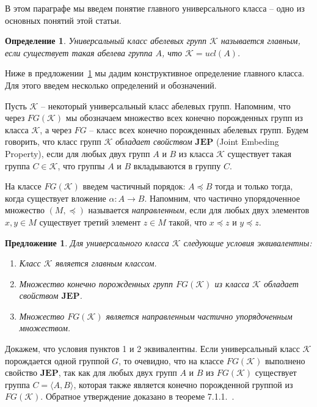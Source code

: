 \documentclass[a4paper,11pt,twoside]{article}
\newtheorem{proposition}{Предложение}[section]
\newtheorem{definition}{Определение}[section]
\def\proof{{\noindent{\bf Доказательство.}} }
\def\K{{\mathcal{K}}}
\def\JEP{{\textbf{JEP}}}
\begin{document}
В этом параграфе мы введем понятие главного универсального класса -- одно из основных понятий этой статьи.

\begin{definition}\label{def:MainClass}
Универсальный класс абелевых групп $\K$ называется главным, если существует такая абелева группа $A$, что $\K = ucl(A)$.
\end{definition}

Ниже в предложении~\ref{prop:DefinitionsMainClass} мы дадим конструктивное определение главного класса. Для этого введем несколько определений и обозначений.

Пусть $\K$ -- некоторый универсальный класс абелевых групп. Напомним, что через $FG(\K)$ мы обозначаем множество всех конечно порожденных групп из класса $\K$, а через $FG$ -- класс всех конечно порожденных абелевых групп. Будем говорить, что класс групп $\K$ \textit{обладает свойством} $\JEP$ (Joint Embeding Property), если для любых двух групп $A$ и $B$ из класса $\K$ существует такая группа $C \in \K$, что группы $A$ и $B$ вкладываются в группу $C$. 

На классе $FG(\K)$ введем частичный порядок: $A \preceq B$ тогда и только тогда, когда существует вложение $\alpha: A \rightarrow B$. Напомним, что частично упорядоченное множество $(M, \preceq)$ называется \textit{направленным}, если для любых двух элементов $x, y \in M$ существует третий элемент $z \in M$ такой, что $x \preceq z$ и $y \preceq z$. 


\begin{proposition}\label{prop:DefinitionsMainClass}
Для универсального класса $\K$ следующие условия эквивалентны:
\begin{enumerate}
\item Класс $\K$ является главным классом.
\item Множество конечно порожденных групп $FG(\K)$ из класса $\K$ обладает свойством $\JEP$.
\item Множество $FG(\K)$ является направленным частично упорядоченным множеством.
\end{enumerate}
\end{proposition}

\proof Докажем, что условия пунктов 1 и 2 эквивалентны. Если универсальный класс $\K$ порождается одной группой $G$, то очевидно, что на классе $FG(\K)$ выполнено свойство $\JEP$, так как для любых двух групп $A$ и $B$ из $FG(\K)$ существует группа $C = \langle A, B\rangle$, которая также является конечно порожденной группой из $FG(\K)$. Обратное утверждение доказано в теореме 7.1.1.~\cite{Hodges}.
\end{document}
